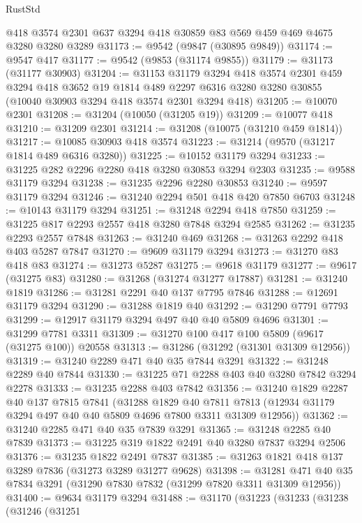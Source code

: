 \begin{lexlean}{RustStd}
\begin{coremodule}
    @418
    @3574
    @2301
    @637
    @3294
    @418
    @30859
    @83
    @569
    @459
    @469
    @4675
    @3280
    @3280
    @3289
@31173 := @9542 (@9847 (@30895 @9849))
@31174 := @9547 @417
@31177 := @9542 (@9853 (@31174 @9855))
@31179 := @31173 (@31177 @30903)
@31204 := @31153
    @31179
    @3294
    @418
    @3574
    @2301
    @459
    @3294
    @418
    @3652
    @19
    @1814
    @489
    @2297
    @6316
    @3280
    @3280
    @30855
    (@10040 @30903 @3294 @418 @3574 @2301 @3294 @418)
@31205 := @10070 @2301
@31208 := @31204 (@10050 (@31205 @19))
@31209 := @10077 @418
@31210 := @31209 @2301
@31214 := @31208 (@10075 (@31210 @459 @1814))
@31217 := @10085 @30903 @418 @3574
@31223 := @31214 (@9570 (@31217 @1814 @489 @6316 @3280))
@31225 := @10152 @31179 @3294
@31233 := @31225 @282 @2296 @2280 @418 @3280 @30853 @3294 @2303
@31235 := @9588 @31179 @3294
@31238 := @31235 @2296 @2280 @30853
@31240 := @9597 @31179 @3294
@31246 := @31240 @2294 @501 @418 @420 @7850 @6703
@31248 := @10143 @31179 @3294
@31251 := @31248 @2294 @418 @7850
@31259 := @31225 @817 @2293 @2557 @418 @3280 @7848 @3294 @2585
@31262 := @31235 @2293 @2557 @7848
@31263 := @31240 @469
@31268 := @31263 @2292 @418 @403 @5287 @7847
@31270 := @9609 @31179 @3294
@31273 := @31270 @83 @418 @83
@31274 := @31273 @5287
@31275 := @9618 @31179
@31277 := @9617 (@31275 @83)
@31280 := @31268 (@31274 @31277 @17887)
@31281 := @31240 @1819
@31286 := @31281 @2291 @40 @137 @7795 @7846
@31288 := @12691 @31179 @3294
@31290 := @31288 @1819 @40
@31292 := @31290 @7791 @7793
@31299 := @12917 @31179 @3294 @497 @40 @40 @5809 @4696
@31301 := @31299 @7781 @3311
@31309 := @31270 @100 @417 @100 @5809 (@9617 (@31275 @100)) @20558
@31313 := @31286 (@31292 (@31301 @31309 @12956))
@31319 := @31240 @2289 @471 @40 @35 @7844 @3291
@31322 := @31248 @2289 @40 @7844
@31330 := @31225 @71 @2288 @403 @40 @3280 @7842 @3294 @2278
@31333 := @31235 @2288 @403 @7842
@31356 := @31240
    @1829
    @2287
    @40
    @137
    @7815
    @7841
    (@31288
      @1829
      @40
      @7811
      @7813
      (@12934 @31179 @3294 @497 @40 @40 @5809 @4696 @7800 @3311 @31309 @12956))
@31362 := @31240 @2285 @471 @40 @35 @7839 @3291
@31365 := @31248 @2285 @40 @7839
@31373 := @31225 @319 @1822 @2491 @40 @3280 @7837 @3294 @2506
@31376 := @31235 @1822 @2491 @7837
@31385 := @31263 @1821 @418 @137 @3289 @7836 (@31273 @3289 @31277 @9628)
@31398 := @31281 @471 @40 @35 @7834 @3291 (@31290 @7830 @7832 (@31299 @7820 @3311 @31309 @12956))
@31400 := @9634 @31179 @3294
@31488 := @31170
    (@31223
      (@31233
        (@31238
          (@31246
            (@31251

\end{coremodule}
\end{lexlean}
